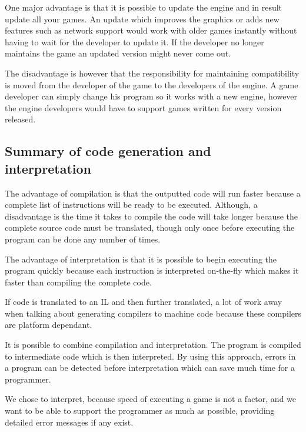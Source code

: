 One major advantage is that it is possible to update the engine and in result
update all your games. An update which improves the graphics or adds new
features such as network support would work with older games instantly without
having to wait for the developer to update it. If the developer no longer
maintains the game an updated version might never come out.

The disadvantage is however that the responsibility for maintaining
compatibility is moved from the developer of the game to the developers of the
engine. A game developer can simply change his program so it works with a new
engine, however the engine developers would have to support games written for
every version released.

\subsection{Summary of code generation and interpretation}
The advantage of compilation is that the outputted code will run faster
because a complete list of instructions will be ready to be executed.
Although, a disadvantage is the time it takes to compile the code will
take longer because the complete source code must be translated, though
only once before executing the program can be done any number of times.

The advantage of interpretation is that it is possible to begin executing the
program quickly because each instruction is interpreted on-the-fly which makes
it faster than compiling the complete code. 

If code is translated to an IL and then further translated, a lot of
work away when talking about generating compilers to machine code
because these compilers are platform dependant.

It is possible to combine compilation and interpretation. The program is
compiled to intermediate code which is then interpreted. By using this approach,
errors in a program can be detected before interpretation which can save much
time for a programmer.

We chose to interpret, because speed of executing a game is not a
factor, and we want to be able to support the programmer as much as
possible, providing detailed error messages if any exist.

